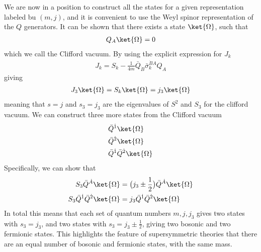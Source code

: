 We are now in a position to construct all the states for a given representation labeled bu $(m,j)$, and it is convenient to use the Weyl spinor representation of the $Q$ generators. It can be shown that there exists a state $\ket{\Omega}$, such that
\begin{align}
    Q_{A}\ket{\Omega}=0
\end{align}
which we call the Clifford vacuum. By using the explicit expression for $J_{k}$
\begin{align}
    J_{k}=S_{k}-\frac{1}{4m}\bar{Q}_{\dot{B}}\bar{\sigma}_{k}^{\dot{B}A}Q_{A}
\end{align}
giving
\begin{align}
    J_{3}\ket{\Omega}=S_{k}\ket{\Omega}=j_{3}\ket{\Omega}
\end{align}
meaning that $s=j$ and $s_{3}=j_{3}$ are the eigenvalues of $S^{2}$ and $S_{3}$ for the clifford vacuum. We can construct three more states from the Clifford vacuum
\begin{align}
    &\bar{Q}^{\dot{1}}\ket{\Omega}
    \\
    &\bar{Q}^{\dot{2}}\ket{\Omega}
    \\
    &\bar{Q}^{\dot{1}}\bar{Q}^{\dot{2}}\ket{\Omega}
\end{align}
Specifically, we can show that
\begin{align}
    S_{3}\bar{Q}^{\dot{A}}\ket{\Omega}&=\big(j_{3}\pm\frac{1}{2}\big)\bar{Q}^{\dot{A}}\ket{\Omega}
    \\
    S_{3}\bar{Q}^{\dot{1}}\bar{Q}^{\dot{2}}\ket{\Omega}&=j_{3}\bar{Q}^{\dot{1}}\bar{Q}^{\dot{2}}\ket{\Omega}
\end{align}
In total this means that each set of quantum numbers $m,j,j_3$ gives two states with $s_3=j_3$, and two states with $s_3=j_3\pm\frac{1}{2}$, giving two bosonic and two fermionic states. This highlights the feature of supersymmetric theories that there are an equal number of bosonic and fermionic states, with the same mass.

